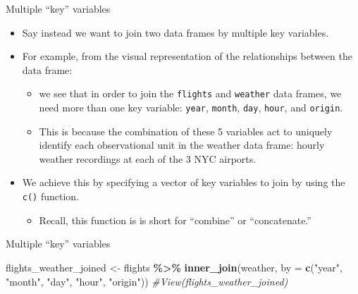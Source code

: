 \documentclass[
  ignorenonframetext,
]{beamer}
\newenvironment{Shaded}{\begin{snugshade}}{\end{snugshade}}
\newcommand{\AttributeTok}[1]{\textcolor[rgb]{0.13,0.29,0.53}{#1}}
\newcommand{\CommentTok}[1]{\textcolor[rgb]{0.56,0.35,0.01}{\textit{#1}}}
\newcommand{\FunctionTok}[1]{\textcolor[rgb]{0.13,0.29,0.53}{\textbf{#1}}}
\newcommand{\NormalTok}[1]{#1}
\newcommand{\OtherTok}[1]{\textcolor[rgb]{0.56,0.35,0.01}{#1}}
\newcommand{\SpecialCharTok}[1]{\textcolor[rgb]{0.81,0.36,0.00}{\textbf{#1}}}
\newcommand{\StringTok}[1]{\textcolor[rgb]{0.31,0.60,0.02}{#1}}
\providecommand{\tightlist}{%
  \setlength{\itemsep}{0pt}\setlength{\parskip}{0pt}}
\begin{document}
\begin{frame}[fragile]{Multiple ``key'' variables}
\protect\hypertarget{multiple-key-variables}{}
\begin{itemize}
\item
  Say instead we want to join two data frames by multiple key variables.
\item
  For example, from the visual representation of the relationships
  between the data frame:

  \begin{itemize}
  \tightlist
  \item
    we see that in order to join the \texttt{flights} and
    \texttt{weather} data frames, we need more than one key variable:
    \texttt{year}, \texttt{month}, \texttt{day}, \texttt{hour}, and
    \texttt{origin}.
  \item
    This is because the combination of these 5 variables act to uniquely
    identify each observational unit in the weather data frame: hourly
    weather recordings at each of the 3 NYC airports.
  \end{itemize}
\item
  We achieve this by specifying a vector of key variables to join by
  using the \texttt{c()} function.

  \begin{itemize}
  \tightlist
  \item
    Recall, this function is is short for ``combine'' or
    ``concatenate.''
  \end{itemize}
\end{itemize}
\end{frame}

\begin{frame}[fragile]{Multiple ``key'' variables}
\protect\hypertarget{multiple-key-variables-1}{}
\tiny

\begin{Shaded}
\begin{Highlighting}[]
\NormalTok{flights\_weather\_joined }\OtherTok{\textless{}{-}}\NormalTok{ flights }\SpecialCharTok{\%\textgreater{}\%}
  \FunctionTok{inner\_join}\NormalTok{(weather, }\AttributeTok{by =} \FunctionTok{c}\NormalTok{(}\StringTok{"year"}\NormalTok{, }\StringTok{"month"}\NormalTok{, }\StringTok{"day"}\NormalTok{, }\StringTok{"hour"}\NormalTok{, }\StringTok{"origin"}\NormalTok{))}
\CommentTok{\#View(flights\_weather\_joined)}
\end{Highlighting}
\end{Shaded}

\normalsize
\end{frame}
\end{document}
